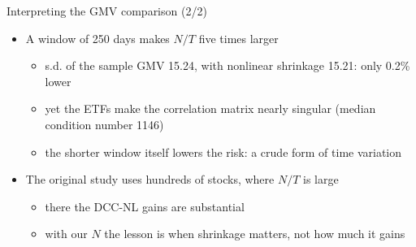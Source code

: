 \begin{frame}{Interpreting the GMV comparison (2/2)}
\itemsize{\small}
\begin{itemize}
    \item A window of 250 days makes $N/T$ five times larger
    \begin{itemize}
        \item s.d. of the sample GMV 15.24, with nonlinear shrinkage 15.21: only 0.2\% lower
        \item yet the ETFs make the correlation matrix nearly singular (median condition number 1146)
        \item the shorter window itself lowers the risk: a crude form of time variation
    \end{itemize}
    \item The original study uses hundreds of stocks, where $N/T$ is large
    \begin{itemize}
        \item there the DCC-NL gains are substantial
        \item with our $N$ the lesson is when shrinkage matters, not how much it gains
    \end{itemize}
\end{itemize}
\end{frame}

